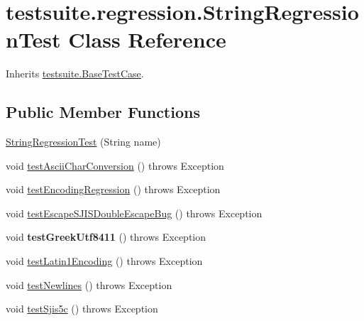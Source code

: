 \hypertarget{classtestsuite_1_1regression_1_1_string_regression_test}{}\section{testsuite.\+regression.\+String\+Regression\+Test Class Reference}
\label{classtestsuite_1_1regression_1_1_string_regression_test}


Inherits \mbox{\hyperlink{classtestsuite_1_1_base_test_case}{testsuite.\+Base\+Test\+Case}}.

\subsection*{Public Member Functions}
\begin{DoxyCompactItemize}
\item 
\mbox{\hyperlink{classtestsuite_1_1regression_1_1_string_regression_test_a74cdd190073561c8807d281869ac10c5}{String\+Regression\+Test}} (String name)
\item 
void \mbox{\hyperlink{classtestsuite_1_1regression_1_1_string_regression_test_a5a8cfa1befdedece1a323e0b37658e39}{test\+Ascii\+Char\+Conversion}} ()  throws Exception 
\item 
void \mbox{\hyperlink{classtestsuite_1_1regression_1_1_string_regression_test_a38cab96afa2172965f228e78ad15fdec}{test\+Encoding\+Regression}} ()  throws Exception 
\item 
void \mbox{\hyperlink{classtestsuite_1_1regression_1_1_string_regression_test_aed5d3525cb076428271b0166d5537e83}{test\+Escape\+S\+J\+I\+S\+Double\+Escape\+Bug}} ()  throws Exception 
\item 
\mbox{\label{classtestsuite_1_1regression_1_1_string_regression_test_a8a0195ab620f64bccaf9f34841536e70}} 
void {\bfseries test\+Greek\+Utf8411} ()  throws Exception 
\item 
void \mbox{\hyperlink{classtestsuite_1_1regression_1_1_string_regression_test_abcc37c5fb4c57b3f201afaadbc55ee13}{test\+Latin1\+Encoding}} ()  throws Exception 
\item 
void \mbox{\hyperlink{classtestsuite_1_1regression_1_1_string_regression_test_a5e1296ac09b9d40f0116a776de542e0a}{test\+Newlines}} ()  throws Exception 
\item 
void \mbox{\hyperlink{classtestsuite_1_1regression_1_1_string_regression_test_a79556638c7ab71bef596c339006c2e19}{test\+Sjis5c}} ()  throws Exception 

\end{DoxyCompactItemize}
